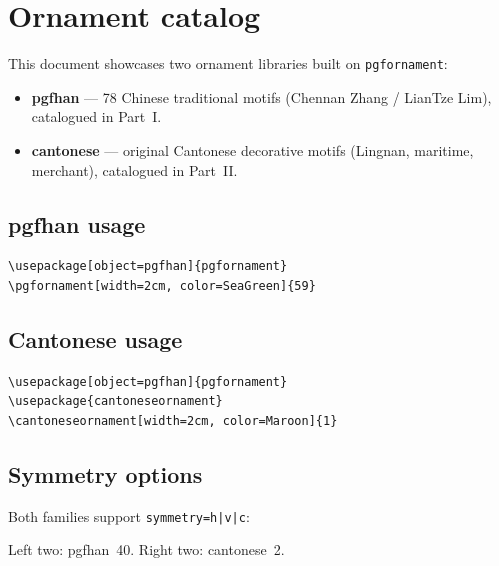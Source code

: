 \chapter{Ornament catalog}

This document showcases two ornament libraries built on \texttt{pgfornament}:

\begin{itemize}
  \item \textbf{pgfhan} --- 78 Chinese traditional motifs (Chennan Zhang /
        LianTze Lim), catalogued in Part~I.
  \item \textbf{cantonese} --- original Cantonese decorative motifs
        (Lingnan, maritime, merchant), catalogued in Part~II.
\end{itemize}

\section{pgfhan usage}

\begin{verbatim}
\usepackage[object=pgfhan]{pgfornament}
\pgfornament[width=2cm, color=SeaGreen]{59}
\end{verbatim}

\begin{center}
\end{center}

\section{Cantonese usage}

\begin{verbatim}
\usepackage[object=pgfhan]{pgfornament}
\usepackage{cantoneseornament}
\cantoneseornament[width=2cm, color=Maroon]{1}
\end{verbatim}

\begin{center}
\end{center}

\section{Symmetry options}

Both families support \texttt{symmetry=h|v|c}:

\begin{center}
\end{center}

\noindent
Left two: pgfhan~40. Right two: cantonese~2.

\tableofcontents
